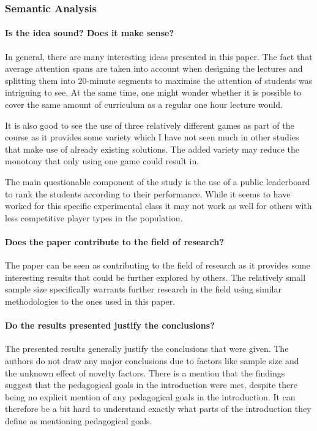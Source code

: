 \subsubsection{Semantic Analysis}
\paragraph{Is the idea sound? Does it make sense?}
In general, there are many interesting ideas presented in this paper. The fact that average attention spans are taken into account when designing the lectures and splitting them into 20-minute segments to maximise the attention of students was intriguing to see. At the same time, one might wonder whether it is possible to cover the same amount of curriculum as a regular one hour lecture would. 

It is also good to see the use of three relatively different games as part of the course as it provides some variety which I have not seen much in other studies that make use of already existing solutions. The added variety may reduce the monotony that only using one game could result in.  

The main questionable component of the study is the use of a public leaderboard to rank the students according to their performance. While it seems to have worked for this specific experimental class it may not work as well for others with less competitive player types in the population. 

\paragraph{Does the paper contribute to the field of research?}
The paper can be seen as contributing to the field of research as it provides some interesting results that could be further explored by others. The relatively small sample size specifically warrants further research in the field using similar methodologies to the ones used in this paper. 

\paragraph{Do the results presented justify the conclusions?}
The presented results generally justify the conclusions that were given. The authors do not draw any major conclusions due to factors like sample size and the unknown effect of novelty factors. There is a mention that the findings suggest that the pedagogical goals in the introduction were met, despite there being no explicit mention of any pedagogical goals in the introduction. It can therefore be a bit hard to understand exactly what parts of the introduction they define as mentioning pedagogical goals.  

